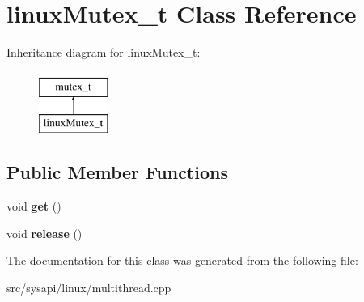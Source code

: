 \hypertarget{classlinuxMutex__t}{\section{linux\-Mutex\-\_\-t \-Class \-Reference}
\label{classlinuxMutex__t}
}
\-Inheritance diagram for linux\-Mutex\-\_\-t\-:\begin{figure}[H]
\begin{center}
\leavevmode
\includegraphics[height=2.000000cm]{classlinuxMutex__t}
\end{center}
\end{figure}
\subsection*{\-Public \-Member \-Functions}
\begin{DoxyCompactItemize}
\item 
\hypertarget{classlinuxMutex__t_a0621b76ec84c94f983aa14a3d8f3ac5e}{void {\bfseries get} ()}\label{classlinuxMutex__t_a0621b76ec84c94f983aa14a3d8f3ac5e}

\item 
\hypertarget{classlinuxMutex__t_a3bef0648118caa2b06ab499d8cae9bf7}{void {\bfseries release} ()}\label{classlinuxMutex__t_a3bef0648118caa2b06ab499d8cae9bf7}

\end{DoxyCompactItemize}


\-The documentation for this class was generated from the following file\-:\begin{DoxyCompactItemize}
\item 
src/sysapi/linux/multithread.\-cpp\end{DoxyCompactItemize}
